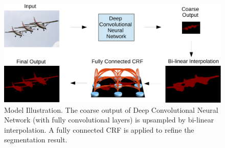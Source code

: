 \begin{figure}
  \centering
  \includegraphics[width=1\linewidth]{fig/model_illustration2.pdf}
  \caption{Model Illustration. The coarse output of Deep Convolutional Neural
    Network (with fully convolutional layers) is upsampled by bi-linear
    interpolation. A fully connected CRF is applied to refine the segmentation
    result.}
  \label{fig:ModelIllustration}
\end{figure}

